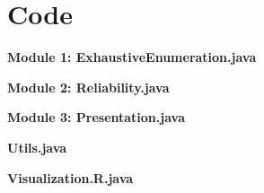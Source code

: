 \documentclass[12pt,letterpaper,titlepage,en-US]{article}
\begin{document}
  

 
\section{Code}

\textbf{Module 1: ExhaustiveEnumeration.java}


\pagebreak
\textbf{Module 2: Reliability.java}


\pagebreak
\textbf{Module 3: Presentation.java}


\pagebreak
\textbf{Utils.java}




\textbf{Visualization.R.java}

\end{document}
